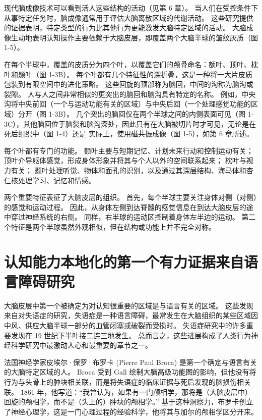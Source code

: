 现代脑成像技术可以看到活人这些结构的活动（见第 6 章）。 
当人们在受控条件下从事特定任务时，脑成像通常用于评估大脑离散区域的代谢活动。 
这些研究提供的证据表明，特定类型的行为比其他行为更能激发大脑特定区域的活动。 
大脑成像生动地表明认知操作主要依赖于大脑皮层，即覆盖两个大脑半球的皱纹灰质（图 1-5）。


在每个半球中，覆盖的皮质分为四个叶，以覆盖它们的颅骨命名：额叶、顶叶、枕叶和颞叶（图 1-3B）。 
每个叶都有几个特征性的深折叠，这是一种将一大片皮质包装到有限空间中的进化策略。 
这些回旋的顶部称为脑回，中间的沟称为脑沟或裂隙。 
人与人之间非常相似的更突出的脑回和脑沟具有特定的名称。 
例如，中央沟将中央前回（一个与运动功能有关的区域）与中央后回（一个处理感觉功能的区域）分开（图 1-3B）。 
几个突出的脑回仅在两个半球之间的内侧表面可见（图 1-3C），其他脑回位于脑裂和脑沟深处，因此只有在大脑被切片时才可见，无论是在死后组织中（图 1-4）还是 实际上，使用磁共振成像（图 1-5），如第 6 章所述。


每个叶都有专门的功能。 
额叶主要与短期记忆、计划未来行动和控制运动有关； 
顶叶介导躯体感觉，形成身体形象并将其与个人以外的空间联系起来； 
枕叶与视力有关； 
颞叶处理听觉、物体和面孔的识别，以及通过其深层结构、海马体和杏仁核处理学习、记忆和情感。


两个重要特征表征了大脑皮层的组织。 
首先，每个半球主要关注身体对侧（对侧）的感觉和运动过程。 
因此，从身体左侧到达脊髓的感觉信息在到达大脑皮层的途中穿过神经系统的右侧。 
同样，右半球的运动区控制着身体左半边的运动。 
第二个特征是两个半球虽然外观相似，但在结构或功能上并不完全对称。


\section{认知能力本地化的第一个有力证据来自语言障碍研究}

大脑皮层中第一个被确定为对认知很重要的区域是与语言有关的区域。 这些发现来自对失语症的研究，失语症是一种语言障碍，最常发生在大脑组织的某些区域因中风、供应大脑半球一部分的血管闭塞或破裂而受损时。 
失语症研究中的许多重要发现在 19 世纪下半叶接二连三地发生。 
总而言之，这些进展构成了人类行为神经科学研究中最激动人心和最重要的章节之一。


法国神经学家皮埃尔·保罗·布罗卡 (Pierre Paul Broca) 是第一个确定与语言有关的大脑特定区域的人。 Broca 受到 Gall 绘制大脑高级功能图的影响，但他没有将行为与头骨上的肿块相关联，而是将失语症的临床证据与死后发现的脑损伤相关联。 
1861 年，他写道：“我曾认为，如果有一门颅相学，那将是（大脑皮层中）回旋的颅相学，而不是（头上的）肿块的颅相学。” 
基于这种洞察力，布罗卡创立了神经心理学，这是一门心理过程的经验科学，他将其与加尔的颅相学区分开来。


